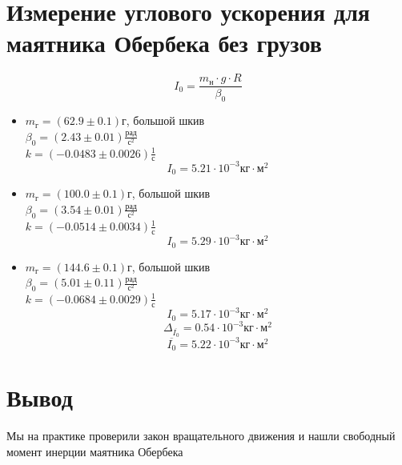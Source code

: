 \documentclass[a4paper,12pt]{article} %
\begin{document}
\section{Измерение углового ускорения для маятника Обербека без грузов}
\[I_0 = \frac{m_{\text{н}}\cdot g\cdot R}{\beta_0}\]
\begin{itemize}
\item $m_{\text{г}} = (62.9\pm0.1)\text{г}$, большой шкив\\
$\beta_0 = (2.43\pm0.01)\frac{\text{рад}}{\text{с}^2}$\\
$k = (-0.0483\pm0.0026)\frac{1}{\text{с}}$
\[I_0 = 5.21\cdot10^{-3}\text{кг}\cdot\text{м}^2\]
\item $m_{\text{г}} = (100.0\pm0.1)\text{г}$, большой шкив\\
$\beta_0 = (3.54\pm0.01)\frac{\text{рад}}{\text{с}^2}$\\
$k = (-0.0514\pm0.0034)\frac{1}{\text{с}}$
\[I_0 = 5.29\cdot10^{-3}\text{кг}\cdot\text{м}^2\]
\item $m_{\text{г}} = (144.6\pm0.1)\text{г}$, большой шкив\\
$\beta_0 = (5.01\pm0.11)\frac{\text{рад}}{\text{с}^2}$\\
$k = (-0.0684\pm0.0029)\frac{1}{\text{с}}$
\[I_0 = 5.17\cdot10^{-3}\text{кг}\cdot\text{м}^2\]
\[\Delta_{\overline{I_0}} = 0.54\cdot10^{-3}\text{кг}\cdot\text{м}^2\]
\[\overline{I_0} = 5.22\cdot10^{-3}\text{кг}\cdot\text{м}^2\]
\end{itemize}
\section{Вывод}
Мы на практике проверили закон вращательного движения и нашли свободный момент инерции маятника Обербека
\end{document}
